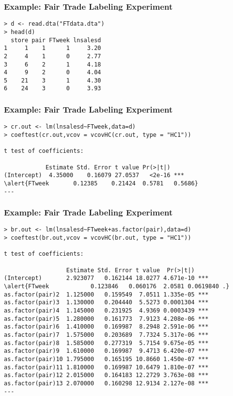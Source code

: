 \documentclass{beamer}
\numberwithin{equation}{section}
\begin{document}

\begin{frame}[fragile]
\frametitle{Example: Fair Trade Labeling Experiment}
{
\footnotesize
\begin{Verbatim}[frame=single, label=R Code, commandchars=\\\{\}]
> d <- read.dta("FTdata.dta")
> head(d)
  store pair FTweek lnsalesd
1     1    1      1     3.20
2     4    1      0     2.77
3     6    2      1     4.18
4     9    2      0     4.04
5    21    3      1     4.30
6    24    3      0     3.93
\end{Verbatim}
}
\end{frame}

\begin{frame}[fragile]
\frametitle{Example: Fair Trade Labeling Experiment}
{
\footnotesize
\begin{Verbatim}[frame=single, label=R Code, commandchars=\\\{\}]
> cr.out <- lm(lnsalesd~FTweek,data=d)
> coeftest(cr.out,vcov = vcovHC(cr.out, type = "HC1"))

t test of coefficients:

            Estimate Std. Error t value Pr(>|t|)    
(Intercept)  4.35000    0.16079 27.0537   <2e-16 ***
\alert{FTweek       0.12385    0.21424  0.5781   0.5686}    
---
\end{Verbatim}
}
\end{frame}


\begin{frame}[fragile]
\frametitle{Example: Fair Trade Labeling Experiment}
{
\footnotesize
\begin{Verbatim}[frame=single, label=R Code, commandchars=\\\{\}]
> br.out <- lm(lnsalesd~FTweek+as.factor(pair),data=d)
> coeftest(br.out,vcov = vcovHC(br.out, type = "HC1"))

t test of coefficients:

                  Estimate Std. Error t value  Pr(>|t|)    
(Intercept)       2.923077   0.162144 18.0277 4.671e-10 ***
\alert{FTweek            0.123846   0.060176  2.0581 0.0619840 .}  
as.factor(pair)2  1.125000   0.159549  7.0511 1.335e-05 ***
as.factor(pair)3  1.130000   0.204440  5.5273 0.0001304 ***
as.factor(pair)4  1.145000   0.231925  4.9369 0.0003439 ***
as.factor(pair)5  1.280000   0.161773  7.9123 4.208e-06 ***
as.factor(pair)6  1.410000   0.169987  8.2948 2.591e-06 ***
as.factor(pair)7  1.575000   0.203689  7.7324 5.317e-06 ***
as.factor(pair)8  1.585000   0.277319  5.7154 9.675e-05 ***
as.factor(pair)9  1.610000   0.169987  9.4713 6.420e-07 ***
as.factor(pair)10 1.795000   0.165195 10.8660 1.450e-07 ***
as.factor(pair)11 1.810000   0.169987 10.6479 1.810e-07 ***
as.factor(pair)12 2.015000   0.164183 12.2729 3.763e-08 ***
as.factor(pair)13 2.070000   0.160298 12.9134 2.127e-08 ***
---
\end{Verbatim}
}
\end{frame}
\end{document}
